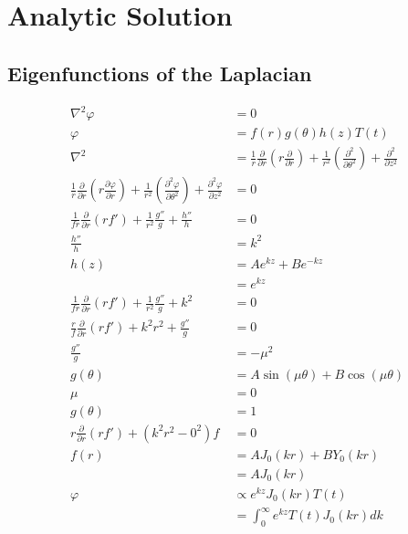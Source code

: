 \documentclass[10pt]{article}
\begin{document}
\section{Analytic Solution}

\subsection{Eigenfunctions of the Laplacian}

\begin{align*}
\nabla^2 \varphi &=0 \\
\varphi &= f(r) g(\theta) h(z) T(t) \\
\nabla^2 &= \frac{1}{r}\frac{\partial}{\partial r} \left( r \frac{\partial}{\partial r} \right) + \frac{1}{r^2} \left( \frac{\partial^2}{\partial \theta^2} \right) + \frac{\partial^2}{\partial z^2} \\
\frac{1}{r}\frac{\partial}{\partial r} \left( r \frac{\partial \varphi}{\partial r} \right) + \frac{1}{r^2} \left( \frac{\partial^2 \varphi}{\partial \theta^2} \right) + \frac{\partial^2 \varphi}{\partial z^2} &= 0 \\
\frac{1}{fr}\frac{\partial}{\partial r}(rf') + \frac{1}{r^2}\frac{g''}{g} + \frac{h''}{h} &= 0 \\
\frac{h''}{h} &= k^2 \\
h(z) &= Ae^{kz} + Be^{-kz} \\
&= e^{kz} \\
\frac{1}{fr}\frac{\partial}{\partial r}(rf') + \frac{1}{r^2}\frac{g''}{g} + k^2 &= 0 \\
\frac{r}{f}\frac{\partial}{\partial r} \left( rf' \right) + k^2r^2 + \frac{g''}{g} &= 0 \\
\frac{g''}{g} &= -\mu^2 \\
g(\theta) &= A \sin(\mu \theta) + B \cos(\mu \theta) \\
\mu &= 0 \\
g(\theta) &= 1 \\
r \frac{\partial}{\partial r}(rf') + (k^2r^2 - 0^2)f &= 0 \\
f(r) &= A J_0(kr) + B Y_0(kr) \\
&= A J_0(kr) \\
\varphi &\propto e^{kz}J_0(kr)T(t) \\
&= \int_0^\infty e^{kz}T(t)J_0(kr)dk
\end{align*}
\end{document}
